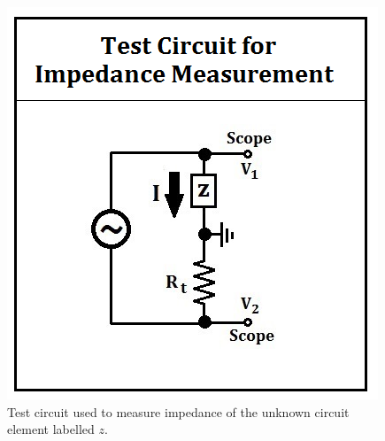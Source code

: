\documentclass[11pt]{article}
\begin{document}
\begin{figure}[t]
\centering
\includegraphics[scale=.6]{testcircuit.png}
\caption{Test circuit used to measure impedance of the unknown circuit element labelled $z$.}
\end{figure}
\end{document}

